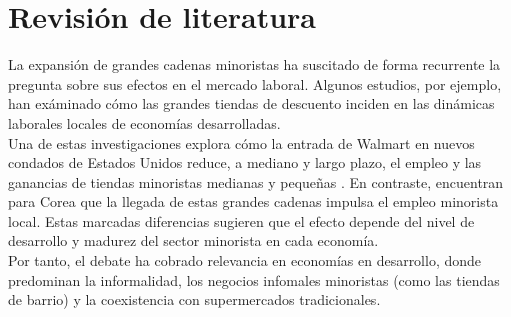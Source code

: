 \documentclass{article}
\begin{document}

\newpage

\section{Revisión de literatura}

La expansión de grandes cadenas minoristas ha suscitado de forma recurrente la pregunta sobre sus efectos en el mercado laboral. Algunos estudios, por ejemplo, han exáminado  cómo las grandes tiendas de descuento inciden en las dinámicas laborales locales de economías desarrolladas. \\

Una de estas investigaciones explora cómo la entrada de Walmart en nuevos condados de Estados Unidos reduce, a mediano y largo plazo, el empleo y las ganancias de tiendas minoristas medianas y pequeñas \parencite{basker2005}. En contraste, \textcite{cho2015} encuentran para Corea que la llegada de estas grandes cadenas impulsa el empleo minorista local. Estas marcadas diferencias sugieren que el efecto depende del nivel de desarrollo y madurez del sector minorista en cada economía. \\

Por tanto, el debate ha cobrado relevancia en economías en desarrollo, donde predominan la informalidad, los negocios infomales minoristas (como las tiendas de barrio) y la coexistencia con supermercados tradicionales. \\
\end{document}
